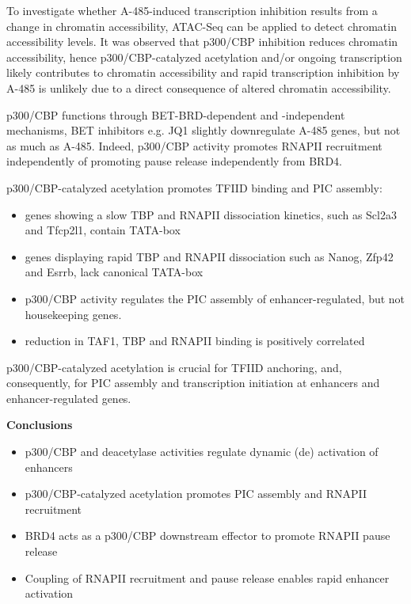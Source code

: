 To investigate whether A-485-induced transcription inhibition results from a change in chromatin accessibility, ATAC-Seq can be applied to detect chromatin accessibility levels. It was observed that p300/CBP inhibition reduces chromatin accessibility, hence p300/CBP-catalyzed acetylation and/or ongoing transcription likely contributes to chromatin accessibility and rapid transcription inhibition by A-485 is unlikely due to a direct consequence of altered chromatin accessibility.

p300/CBP functions through BET-BRD-dependent and -independent mechanisms, BET inhibitors e.g. JQ1 slightly downregulate A-485 genes, but not as much as A-485. Indeed, p300/CBP activity promotes RNAPII recruitment independently of promoting pause release independently from BRD4.

p300/CBP-catalyzed acetylation promotes TFIID binding and PIC assembly:
\begin{itemize}
\item genes showing a slow TBP and RNAPII dissociation kinetics, such as Scl2a3 and Tfcp2l1, contain
TATA-box
\item genes displaying rapid TBP and RNAPII dissociation such as Nanog, Zfp42 and Esrrb, lack
canonical TATA-box
\item p300/CBP activity regulates the PIC assembly of enhancer-regulated, but not housekeeping genes.
\item reduction in TAF1, TBP and RNAPII binding is positively correlated
\end{itemize}

p300/CBP-catalyzed acetylation is crucial for TFIID anchoring, and, consequently, for PIC assembly and transcription initiation at enhancers and enhancer-regulated genes.

\textbf{Conclusions}
\begin{itemize}
\item p300/CBP and deacetylase activities regulate dynamic (de) activation of enhancers
\item p300/CBP-catalyzed acetylation promotes PIC assembly and RNAPII recruitment
\item BRD4 acts as a p300/CBP downstream effector to promote RNAPII pause release
\item Coupling of RNAPII recruitment and pause release enables rapid enhancer activation
\end{itemize}

